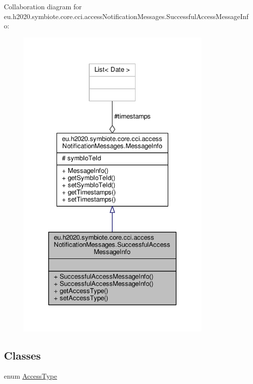 Collaboration diagram for eu.\+h2020.\+symbiote.\+core.\+cci.\+access\+Notification\+Messages.\+Successful\+Access\+Message\+Info\+:
\nopagebreak
\begin{figure}[H]
\begin{center}
\leavevmode
\includegraphics[width=274pt]{classeu_1_1h2020_1_1symbiote_1_1core_1_1cci_1_1accessNotificationMessages_1_1SuccessfulAccessMessageInfo__coll__graph}
\end{center}
\end{figure}
\subsection*{Classes}
\begin{DoxyCompactItemize}
\item 
enum \hyperlink{enumeu_1_1h2020_1_1symbiote_1_1core_1_1cci_1_1accessNotificationMessages_1_1SuccessfulAccessMessageInfo_1_1AccessType}{Access\+Type}
\end{DoxyCompactItemize}
